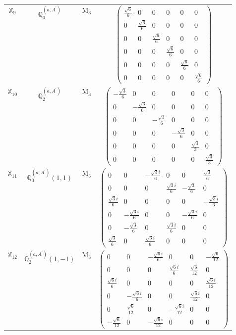 \documentclass[fleqn,10pt,landscape]{article}
\begin{document}
\begin{itemize}
\begin{center}
\begin{longtable}{c|c|c|c}
$ \mathbb{X}_{9} $ & $\mathbb{Q}_{0}^{(a,A^{\prime})}$ & M$_{3}$ & $\begin{pmatrix} \frac{\sqrt{6}}{6} & 0 & 0 & 0 & 0 & 0 \\ 0 & \frac{\sqrt{6}}{6} & 0 & 0 & 0 & 0 \\ 0 & 0 & \frac{\sqrt{6}}{6} & 0 & 0 & 0 \\ 0 & 0 & 0 & \frac{\sqrt{6}}{6} & 0 & 0 \\ 0 & 0 & 0 & 0 & \frac{\sqrt{6}}{6} & 0 \\ 0 & 0 & 0 & 0 & 0 & \frac{\sqrt{6}}{6} \end{pmatrix}$ \\
$ \mathbb{X}_{10} $ & $\mathbb{Q}_{2}^{(a,A^{\prime})}$ & M$_{3}$ & $\begin{pmatrix} - \frac{\sqrt{3}}{6} & 0 & 0 & 0 & 0 & 0 \\ 0 & - \frac{\sqrt{3}}{6} & 0 & 0 & 0 & 0 \\ 0 & 0 & - \frac{\sqrt{3}}{6} & 0 & 0 & 0 \\ 0 & 0 & 0 & - \frac{\sqrt{3}}{6} & 0 & 0 \\ 0 & 0 & 0 & 0 & \frac{\sqrt{3}}{3} & 0 \\ 0 & 0 & 0 & 0 & 0 & \frac{\sqrt{3}}{3} \end{pmatrix}$ \\
$ \mathbb{X}_{11} $ & $\mathbb{Q}_{0}^{(a,A^{\prime})}(1,1)$ & M$_{3}$ & $\begin{pmatrix} 0 & 0 & - \frac{\sqrt{3} i}{6} & 0 & 0 & \frac{\sqrt{3}}{6} \\ 0 & 0 & 0 & \frac{\sqrt{3} i}{6} & - \frac{\sqrt{3}}{6} & 0 \\ \frac{\sqrt{3} i}{6} & 0 & 0 & 0 & 0 & - \frac{\sqrt{3} i}{6} \\ 0 & - \frac{\sqrt{3} i}{6} & 0 & 0 & - \frac{\sqrt{3} i}{6} & 0 \\ 0 & - \frac{\sqrt{3}}{6} & 0 & \frac{\sqrt{3} i}{6} & 0 & 0 \\ \frac{\sqrt{3}}{6} & 0 & \frac{\sqrt{3} i}{6} & 0 & 0 & 0 \end{pmatrix}$ \\
$ \mathbb{X}_{12} $ & $\mathbb{Q}_{2}^{(a,A^{\prime})}(1,-1)$ & M$_{3}$ & $\begin{pmatrix} 0 & 0 & - \frac{\sqrt{6} i}{6} & 0 & 0 & - \frac{\sqrt{6}}{12} \\ 0 & 0 & 0 & \frac{\sqrt{6} i}{6} & \frac{\sqrt{6}}{12} & 0 \\ \frac{\sqrt{6} i}{6} & 0 & 0 & 0 & 0 & \frac{\sqrt{6} i}{12} \\ 0 & - \frac{\sqrt{6} i}{6} & 0 & 0 & \frac{\sqrt{6} i}{12} & 0 \\ 0 & \frac{\sqrt{6}}{12} & 0 & - \frac{\sqrt{6} i}{12} & 0 & 0 \\ - \frac{\sqrt{6}}{12} & 0 & - \frac{\sqrt{6} i}{12} & 0 & 0 & 0 \end{pmatrix}$ \\

\end{longtable}
\end{center}
\end{itemize}
\end{document}
